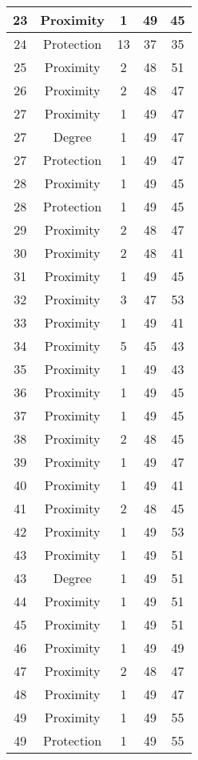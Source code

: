 \documentclass[results.tex]{subfiles}
\begin{document}
\begin{center}
\begin{tabular}{| c || c | c | c | c |}
    \hline
    23 & Proximity & 1 & 49 & 45 \\ 
    \hline
    24 & Protection & 13 & 37 & 35 \\ 
    \hline
    25 & Proximity & 2 & 48 & 51 \\ 
    \hline
    26 & Proximity & 2 & 48 & 47 \\ 
    \hline
    27 & Proximity & 1 & 49 & 47 \\ 
    \hline
    27 & Degree & 1 & 49 & 47 \\ 
    \hline
    27 & Protection & 1 & 49 & 47 \\ 
    \hline
    28 & Proximity & 1 & 49 & 45 \\ 
    \hline
    28 & Protection & 1 & 49 & 45 \\ 
    \hline
    29 & Proximity & 2 & 48 & 47 \\ 
    \hline
    30 & Proximity & 2 & 48 & 41 \\ 
    \hline
    31 & Proximity & 1 & 49 & 45 \\ 
    \hline
    32 & Proximity & 3 & 47 & 53 \\ 
    \hline
    33 & Proximity & 1 & 49 & 41 \\ 
    \hline
    34 & Proximity & 5 & 45 & 43 \\ 
    \hline
    35 & Proximity & 1 & 49 & 43 \\ 
    \hline
    36 & Proximity & 1 & 49 & 45 \\ 
    \hline
    37 & Proximity & 1 & 49 & 45 \\ 
    \hline
    38 & Proximity & 2 & 48 & 45 \\ 
    \hline
    39 & Proximity & 1 & 49 & 47 \\ 
    \hline
    40 & Proximity & 1 & 49 & 41 \\ 
    \hline
    41 & Proximity & 2 & 48 & 45 \\ 
    \hline
    42 & Proximity & 1 & 49 & 53 \\ 
    \hline
    43 & Proximity & 1 & 49 & 51 \\ 
    \hline
    43 & Degree & 1 & 49 & 51 \\ 
    \hline
    44 & Proximity & 1 & 49 & 51 \\ 
    \hline
    45 & Proximity & 1 & 49 & 51 \\ 
    \hline
    46 & Proximity & 1 & 49 & 49 \\ 
    \hline
    47 & Proximity & 2 & 48 & 47 \\ 
    \hline
    48 & Proximity & 1 & 49 & 47 \\ 
    \hline
    49 & Proximity & 1 & 49 & 55 \\ 
    \hline
    49 & Protection & 1 & 49 & 55 \\ 
    \hline   \end{tabular}
\end{center}
\end{document}
